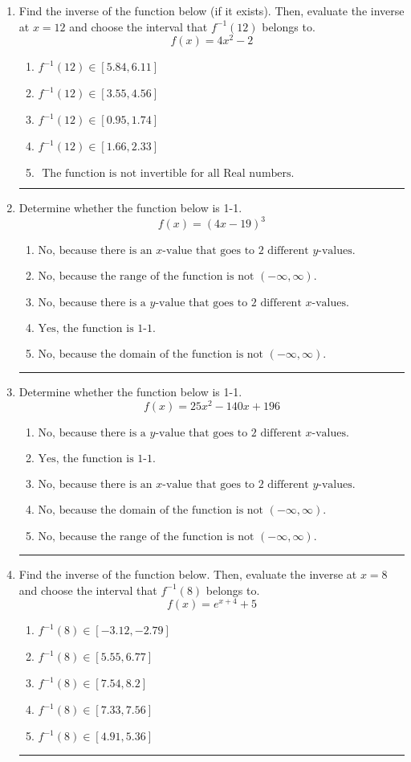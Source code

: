 \documentclass[14pt]{extbook}
\newcommand{\litem}[1]{\item#1\hspace*{-1cm}\rule{\textwidth}{0.4pt}}
\begin{document}
\begin{enumerate}
\litem{
Find the inverse of the function below (if it exists). Then, evaluate the inverse at $x = 12$ and choose the interval that $f^{-1}(12)$ belongs to.\[ f(x) = 4 x^2 - 2 \]\begin{enumerate}[label=\Alph*.]
\item \( f^{-1}(12) \in [5.84, 6.11] \)
\item \( f^{-1}(12) \in [3.55, 4.56] \)
\item \( f^{-1}(12) \in [0.95, 1.74] \)
\item \( f^{-1}(12) \in [1.66, 2.33] \)
\item \( \text{ The function is not invertible for all Real numbers. } \)

\end{enumerate} }
\litem{
Determine whether the function below is 1-1.\[ f(x) = (4 x - 19)^3 \]\begin{enumerate}[label=\Alph*.]
\item \( \text{No, because there is an $x$-value that goes to 2 different $y$-values.} \)
\item \( \text{No, because the range of the function is not $(-\infty, \infty)$.} \)
\item \( \text{No, because there is a $y$-value that goes to 2 different $x$-values.} \)
\item \( \text{Yes, the function is 1-1.} \)
\item \( \text{No, because the domain of the function is not $(-\infty, \infty)$.} \)

\end{enumerate} }
\litem{
Determine whether the function below is 1-1.\[ f(x) = 25 x^2 - 140 x + 196 \]\begin{enumerate}[label=\Alph*.]
\item \( \text{No, because there is a $y$-value that goes to 2 different $x$-values.} \)
\item \( \text{Yes, the function is 1-1.} \)
\item \( \text{No, because there is an $x$-value that goes to 2 different $y$-values.} \)
\item \( \text{No, because the domain of the function is not $(-\infty, \infty)$.} \)
\item \( \text{No, because the range of the function is not $(-\infty, \infty)$.} \)

\end{enumerate} }
\litem{
Find the inverse of the function below. Then, evaluate the inverse at $x = 8$ and choose the interval that $f^{-1}(8)$ belongs to.\[ f(x) = e^{x+4}+5 \]\begin{enumerate}[label=\Alph*.]
\item \( f^{-1}(8) \in [-3.12, -2.79] \)
\item \( f^{-1}(8) \in [5.55, 6.77] \)
\item \( f^{-1}(8) \in [7.54, 8.2] \)
\item \( f^{-1}(8) \in [7.33, 7.56] \)
\item \( f^{-1}(8) \in [4.91, 5.36] \)


\end{enumerate}}
\end{enumerate}
\end{document}
